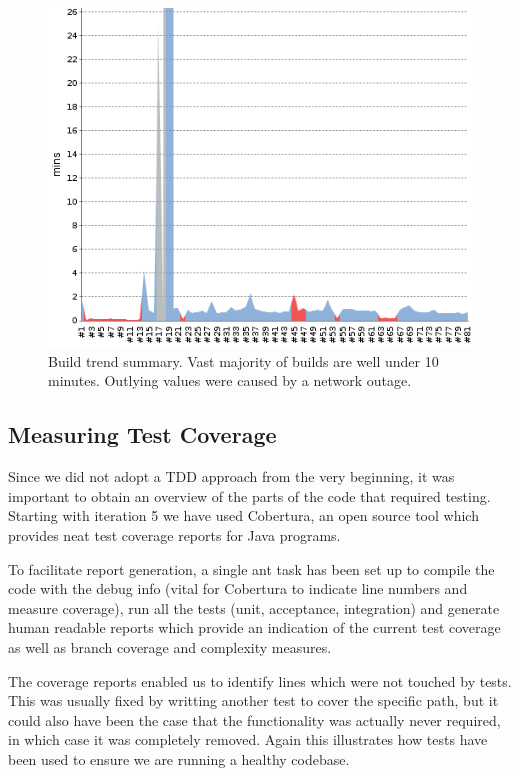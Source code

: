 \documentclass[10pt]{report}
\begin{document}
\begin{figure}[ht]
\centering
\includegraphics[bb=0 0 500 400, scale = 0.5]{build-trend.png}
\caption{Build trend summary. Vast majority of builds are well under 10 minutes. Outlying values were caused by a network outage.}
\end{figure}

\subsection{Measuring Test Coverage}

Since we did not adopt a TDD approach from the very beginning, it was important to obtain an overview of the parts of the code that required testing. Starting with iteration 5 we have used Cobertura,  an open source tool which provides neat test coverage reports for Java programs.

To facilitate report generation, a single ant task has been set up to compile the code with the debug info (vital for Cobertura to indicate line numbers and measure coverage), run all the tests (unit, acceptance, integration) and generate human readable reports which provide an indication of the current test coverage as well as branch coverage and complexity measures.

The coverage reports enabled us to identify lines which were not touched by tests. This was usually fixed by writting another test to cover the specific path, but it could also have been the case that the functionality was actually never required, in which case it was completely removed. Again this illustrates how tests have been used to ensure we are running a healthy codebase.
\end{document}
